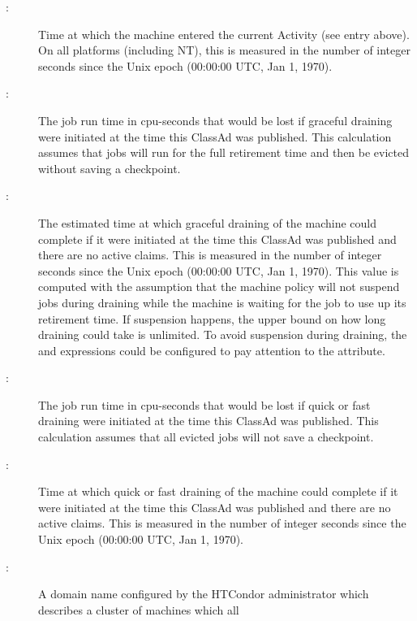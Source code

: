 \begin{description}
\item[:] Time at which the machine
entered the current Activity (see  entry above).  On
all platforms (including NT), this is measured in the number of
integer seconds since the Unix epoch (00:00:00 UTC, Jan 1, 1970).
%
\item[:] The
job run time in cpu-seconds that would be lost if graceful draining
were initiated at the time this ClassAd was published.  
This calculation assumes
that jobs will run for the full retirement time and then be evicted
without saving a checkpoint.
%
\item[:] The
estimated time at
which graceful draining of the machine could complete if it were
initiated at the time this ClassAd was published
and there are no active claims.  This is measured in the
number of integer seconds since the Unix epoch (00:00:00 UTC, Jan 1,
1970).  This value is computed with the assumption that the machine
policy will not suspend jobs during draining while the machine is
waiting for the job to use up its retirement time.  If suspension
happens, the upper bound on how long draining could take is
unlimited.  To avoid suspension during draining, the 
and  expressions could be configured to pay
attention to the  attribute.
%
\item[:] The
job run time in cpu-seconds that would be lost if quick or fast draining
were initiated at the time this ClassAd was published.  This calculation assumes
that all evicted jobs will not save a checkpoint.
%
\item[:] Time at
which quick or fast draining of the machine could complete if it were
initiated at the time this ClassAd was published 
and there are no active claims.  This is measured in the
number of integer seconds since the Unix epoch (00:00:00 UTC, Jan 1,
1970).
%
\item[:] A domain name configured by the
HTCondor administrator which describes a cluster of machines which all

\end{description}
